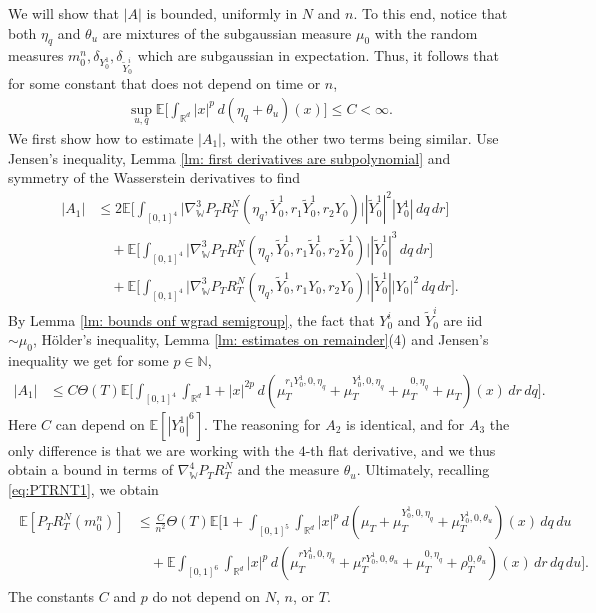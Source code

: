 \documentclass[11pt,reqno]{amsart}
\numberwithin{equation}{section}
\theoremstyle{definition}
\def\E{{\mathbb E}}
\def\R{{\mathbb R}}
\def\N{{\mathbb N}}
\newcommand{\wgrad}{\nabla_{\W}}
\newcommand{\W}{\mathbb W}
\begin{document}
    We will show that $|A|$ is bounded, uniformly in $N$ and $n$.
    To this end, notice that both $\eta_q$ and $\theta_u$ are mixtures of the subgaussian measure $\mu_0$ with the random measures $m_0^n,\delta_{Y_0^1},\delta_{\widetilde{Y}_0^i}$ which are subgaussian in expectation. Thus, it follows that for some constant that does not depend on time or $n$,
    \begin{align}
    \label{eq: bounds on eta and theta}
        \sup_{u,q}\E\Big[\int_{\R^d} |x|^p\,d(\eta_q+\theta_u)(x)\Big]\leq C<\infty.
    \end{align}
    We first show how to estimate  $|A_1|$, with the other two terms being similar. Use Jensen's inequality, Lemma \ref{lm: first derivatives are subpolynomial} and symmetry of the Wasserstein derivatives to find  
    \begin{align*}
        |A_1| &\leq 2\E\Big[\int_{[0,1]^4} \big|\wgrad^3 P_T R^N_T(\eta_{q},\widetilde{Y}_0^1,r_1\widetilde{Y}_0^1,r_2Y_{0})\big||\widetilde{Y}_0^1|^2|Y^1_{0}|   \,dq\,dr\Big]\\
        &\quad +\E\Big[\int_{[0,1]^4} \big|\wgrad^3 P_T R^N_T(\eta_{q},\widetilde{Y}_0^1,r_1\widetilde{Y}_0^1,r_2\widetilde{Y}_0^1)\big||\widetilde{Y}_0^1|^3 \,dq\,dr\Big]\\
        &\quad +\E\Big[\int_{[0,1]^4} \big|\wgrad^3 P_T R^N_T(\eta_{q},\widetilde{Y}_0^1,r_1Y_{0},r_2Y_{0})\big||\widetilde{Y}_0^1||Y_{0}|^2  \,dq\,dr\Big].
    \end{align*}
    By Lemma \ref{lm: bounds onf wgrad semigroup}, the fact that $Y^i_0$ and $\widetilde{Y}^i_0$ are iid $\sim\mu_0$, H\"older's inequality, Lemma \ref{lm: estimates on remainder}(4) and Jensen's inequality we get for some $p\in \N$,
    \begin{align} 
    \label{eq: bound on A1}    
    |A_1|
    &\leq C\Theta(T)
     \E\bigg[\int_{[0,1]^4}\int_{\R^d}1+ |x|^{2p} \,d(\mu_T^{r_1Y_0^1,0,\eta_q}+\mu_T^{Y_0^1,0,\eta_q}+\mu_T^{0,\eta_q}+\mu_T)(x)\,dr\,dq\bigg] .
    \end{align}
     Here $C$ can depend on $\E[|Y_0^1|^6]$.
    The reasoning for $A_2$ is identical, and for $A_3$ the only difference is that we are working with the $4$-th flat derivative, and we thus obtain a bound in terms of $\wgrad^4 P_T R^N_T$ and the measure $\theta_{u}$. Ultimately,  recalling  \eqref{eq:PTRNT1}, we obtain
    \begin{align}
        \label{bound on P_T R}
        \begin{split}
            \E[P_T R^N_T(m_0^n)] &\leq  \frac{C }{n^2} \Theta(T)\E\bigg[1 + \int_{[0,1]^5} \int_{\R^d}|x|^{p}\,d(\mu_T+\mu_T^{Y_0^1,0,\eta_q}+\mu_T^{Y_0^1,0,\theta_u})(x)\,dq\,du\\
            &\quad +  \E\int_{[0,1]^6} \int_{\R^d}|x|^p\,d(\mu_T^{rY_0^1,0,\eta_q}+\mu_T^{rY_0^1,0,\theta_u}+\mu_T^{0,\eta_q}+\rho_T^{0,\theta_u})(x)\,dr\,dq\,du \bigg]. 
    \end{split}
    \end{align}
    The constants $C$ and $p$ do not depend on $N$, $n$, or $T$.
    
\end{document}
